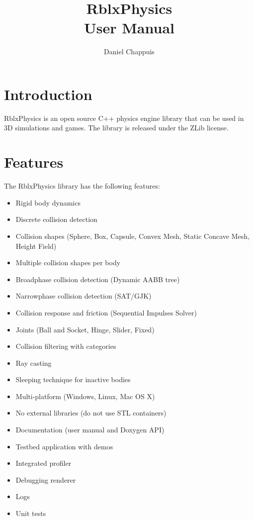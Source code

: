 \documentclass[a4paper,12pt]{article}
\begin{document}
   \author{Daniel Chappuis}
   \title{RblxPhysics \\ User Manual}
   \maketitle

   \tableofcontents

   \newpage


   \section{Introduction}

  RblxPhysics is an open source C++ physics engine library that can be used
  in 3D simulations and games. The library is released under the ZLib license.

   \section{Features}

   The RblxPhysics library has the following features:

   \begin{itemize}
    \item Rigid body dynamics
    \item Discrete collision detection
    \item Collision shapes (Sphere, Box, Capsule, Convex Mesh, Static Concave Mesh, Height Field)
    \item Multiple collision shapes per body
    \item Broadphase collision detection (Dynamic AABB tree)
    \item Narrowphase collision detection (SAT/GJK)
    \item Collision response and friction (Sequential Impulses Solver)
    \item Joints (Ball and Socket, Hinge, Slider, Fixed)
    \item Collision filtering with categories
    \item Ray casting
    \item Sleeping technique for inactive bodies
    \item Multi-platform (Windows, Linux, Mac OS X)
    \item No external libraries (do not use STL containers)
    \item Documentation (user manual and Doxygen API)
    \item Testbed application with demos
    \item Integrated profiler
    \item Debugging renderer
    \item Logs
    \item Unit tests
   \end{itemize}
\end{document}
